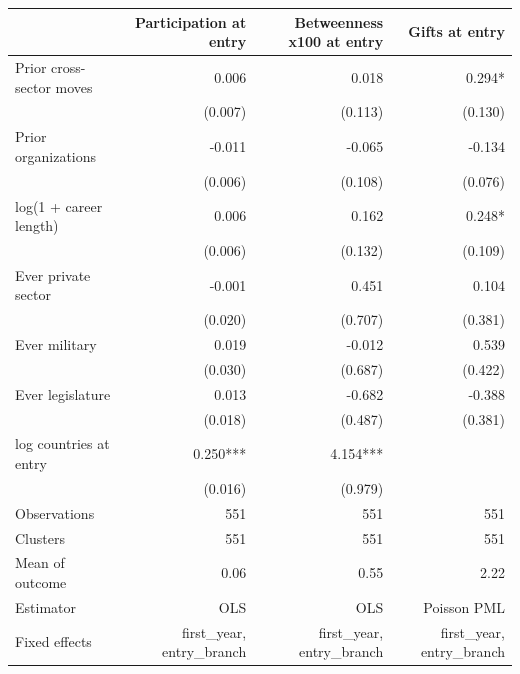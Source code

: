 \begin{tabular}{lrrr}
\toprule
 & Participation at entry & Betweenness x100 at entry & Gifts at entry \\
\midrule
Prior cross-sector moves & 0.006 & 0.018 & 0.294* \\
 & (0.007) & (0.113) & (0.130) \\
Prior organizations & -0.011 & -0.065 & -0.134 \\
 & (0.006) & (0.108) & (0.076) \\
log(1 + career length) & 0.006 & 0.162 & 0.248* \\
 & (0.006) & (0.132) & (0.109) \\
Ever private sector & -0.001 & 0.451 & 0.104 \\
 & (0.020) & (0.707) & (0.381) \\
Ever military & 0.019 & -0.012 & 0.539 \\
 & (0.030) & (0.687) & (0.422) \\
Ever legislature & 0.013 & -0.682 & -0.388 \\
 & (0.018) & (0.487) & (0.381) \\
log countries at entry & 0.250*** & 4.154*** &  \\
 & (0.016) & (0.979) &  \\
Observations & 551 & 551 & 551 \\
Clusters & 551 & 551 & 551 \\
Mean of outcome & 0.06 & 0.55 & 2.22 \\
Estimator & OLS & OLS & Poisson PML \\
Fixed effects & first\_year, entry\_branch & first\_year, entry\_branch & first\_year, entry\_branch \\
\bottomrule
\end{tabular}
\par{}
